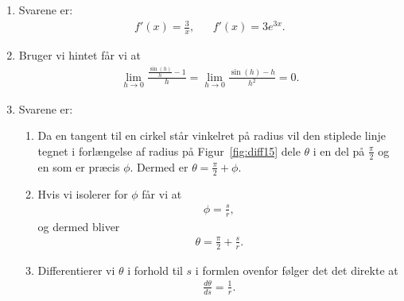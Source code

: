 \begin{enumerate}
	\item Svarene er:
	\begin{align*}
	f'(x)=\frac{3}{x},&& f'(x)=3e^{3x}.
	\end{align*}
	
	\item \label{it:diff14ans}	Bruger vi hintet får vi at
	\begin{align*}
	\lim_{h\to 0} \frac{\frac{\sin(h)}{h}-1}{h}=\lim_{h\to 0} \frac{\sin(h)-h}{h^2}=0.
	\end{align*}
	
	\item\label{it:diff15ans} Svarene er:	
	\begin{enumerate}
		\item Da en tangent til en cirkel står vinkelret på radius vil den stiplede linje tegnet i forlængelse af radius på Figur~\ref{fig:diff15} dele $\theta$ i en del på $\frac{\pi}{2}$ og en som er præcis $\phi$. Dermed er $\theta=\frac{\pi}{2}+\phi$.
		\item Hvis vi isolerer for $\phi$ får vi at 
		\begin{align*}
		\phi=\frac{s}{r},
		\end{align*}
		og dermed bliver
		\begin{align*}
		\theta=\frac{\pi}{2}+\frac{s}{r}.
		\end{align*}
		
		\item Differentierer vi $ \theta $ i forhold til $s$ i formlen ovenfor følger det det direkte at
		\begin{align*}
		\frac{d \theta}{d s}= \frac{1}{r}.
		\end{align*}
	\end{enumerate}
	



\end{enumerate}

